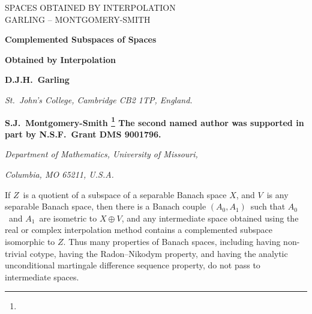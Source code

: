 \def\cN{{\cal N}}
\def\F{{\cal F}}
\def\A{{\cal A}}
\def\B{{\cal B}}

\def\Id{\hbox{\rm Id}}

\def\invp{{1\over p}}
\def\invq{{1\over q}}
\def\invc{{c^{-1}}}
\def\half{{1\over 2}}
\def\smallhalf{\ts\half}

\def\list#1,#2{#1_1$, $#1_2,\ldots,$\ $#1_{#2}}
\def\lists#1{#1_1$, $#1_2,\ldots}

\def\set#1{\{1$, $2,\ldots,$\ $#1\}}
\def\span#1{\overline{\hbox{\rm span}}\{#1\}}

\def\lnorm{\left\|}
\def\rnorm{\right\|}
\def\normo#1{\lnorm #1 \rnorm}
\def\widedot{\,\cdot\,}
\def\normdot{\normo{\widedot}}
\def\trinormo#1{\left|\left|\left| #1 \right|\right|\right|}
\def\trinormdot{\trinormo{\widedot}}

\def\lmod{\left|}
\def\rmod{\right|}
\def\modo#1{\lmod #1 \rmod}

\def\angleo#1{\left\langle #1 \right\rangle}

\def\dom#1{{\vert_{#1}}}


\def\O{\Omega}
\def\couple#1{(#1_0,#1_1)}
\def\sig#1{#1_0 + #1_1}
\def\del#1{#1_0 \cap #1_1}
\def\Xq{X_0\oplus_Q X_1}
\def\invn{{1\over n}}
\def\invepsilonn{\ts{1\over\epsilon_n}}


\setheadline SPACES OBTAINED BY INTERPOLATION\\
             GARLING -- MONTGOMERY-SMITH

\finalversion

{
\seventeensize
\centerline{\bf Complemented Subspaces of Spaces}
\centerline{\bf Obtained by Interpolation}
}
\bigskip\bigskip
\centerline{\bf D.J.H.~Garling}
{
\sevensize\baselineskip=4.0mm
\centerline{\it St.~John's College, Cambridge CB2 1TP, England.}
}
\medskip
\centerline{\bf S.J.~Montgomery-Smith%
\footnote{}%
{The second named author was supported in part by N.S.F.\ Grant DMS 9001796.}%
}
{
\sevensize\baselineskip=4.0mm
\centerline{\it Department of Mathematics, University of Missouri,}
\centerline{\it Columbia, MO 65211, U.S.A.}
}
\bigskip

\Abstract

If $Z$\ is a quotient of a subspace of a separable Banach space $X$, and
$V$\ is any separable Banach space, then there is a Banach couple
$\couple A$\ such that $A_0$\ and $A_1$\ are isometric to $X\oplus V$,
and any intermediate space obtained using the real or complex interpolation
method contains a complemented subspace isomorphic to $Z$. Thus many properties
of Banach spaces, including having non-trivial cotype, having the Radon--Nikodym
property, and having the analytic unconditional martingale difference
sequence property, do not pass to intermediate spaces.

